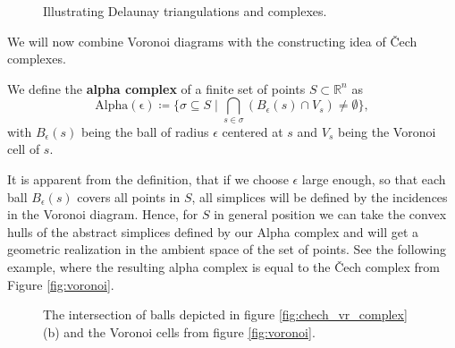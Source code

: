 \begin{figure}[H]
\begin{subfigure}[b]{0.49\textwidth}
\begin{center}

\end{center}
\end{subfigure}
\begin{subfigure}[b]{0.49\textwidth}
\begin{center}

\end{center}
\end{subfigure}
\caption{Illustrating Delaunay triangulations and complexes.}
\label{fig:delaunay}
\end{figure}

We will now combine Voronoi diagrams with the constructing idea of \v{C}ech complexes. 

\begin{defi}
We define the \textbf{alpha complex} of a finite set of points $S \subset \mathbb{R}^n$ as \[
\operatorname{Alpha(\epsilon)} \coloneqq \{\sigma \subseteq S \mid \bigcap\limits_{s \in \sigma}(B_\epsilon(s) \cap V_s) \neq \emptyset\},
\]
with $B_\epsilon(s)$ being the ball of radius $\epsilon$ centered at $s$ and $V_s$ being the Voronoi cell of $s$.
\end{defi}

It is apparent from the definition, that if we choose $\epsilon$ large enough, so that each ball $B_\epsilon(s)$ covers all points in $S$, all simplices will be defined by the incidences in the Voronoi diagram. Hence, for $S$ in general position we can take the convex hulls of the abstract simplices defined by our Alpha complex and will get a geometric realization in the ambient space of the set of points. See the following example, where the resulting alpha complex is equal to the \v{C}ech complex from Figure \ref{fig:voronoi}. 

\begin{figure}[H]
\begin{subfigure}[b]{0.99\textwidth}
\begin{center}

\end{center}
\end{subfigure}

\caption{The intersection of balls depicted in figure \ref{fig:chech_vr_complex} (b) and the Voronoi cells from figure \ref{fig:voronoi}.}
\label{fig:alpha_complex}
\end{figure}

